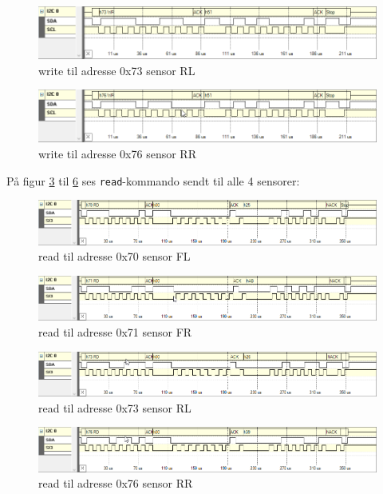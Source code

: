 \begin{figure}[h]
	\centering
	\includegraphics[scale=0.6]{../fig/billeder/psoc_distancesensor_modultest/I2C_write_0x73_RL.png}
	\caption{write til adresse 0x73 sensor RL}
	\label{fig:write_RL}
\end{figure}

\begin{figure}[h]
	\centering
	\includegraphics[scale=0.6]{../fig/billeder/psoc_distancesensor_modultest/I2C_write_0x76_RR.png}
	\caption{write til adresse 0x76 sensor RR}
	\label{fig:write_RR}
\end{figure}

\newpage

På figur \ref{fig:read_FL} til \ref{fig:read_RR} ses \texttt{read}-kommando sendt til alle 4 sensorer:

\begin{figure}[h]
	\centering
	\includegraphics[scale=0.6]{../fig/billeder/psoc_distancesensor_modultest/I2C_read_0x70_FL.png}
	\caption{read til adresse 0x70 sensor FL}
	\label{fig:read_FL}
\end{figure}

\begin{figure}[h]
	\centering
	\includegraphics[scale=0.6]{../fig/billeder/psoc_distancesensor_modultest/I2C_read_0x71_FR.png}
	\caption{read til adresse 0x71 sensor FR}
	\label{fig:read_FR}
\end{figure}

\begin{figure}[h]
	\centering
	\includegraphics[scale=0.6]{../fig/billeder/psoc_distancesensor_modultest/I2C_read_0x73_RL.png}
	\caption{read til adresse 0x73 sensor RL}
	\label{fig:read_RL}
\end{figure}

\begin{figure}[h]
	\centering
	\includegraphics[scale=0.6]{../fig/billeder/psoc_distancesensor_modultest/I2C_read_0x76_RR.png}
	\caption{read til adresse 0x76 sensor RR}
	\label{fig:read_RR}
\end{figure}

